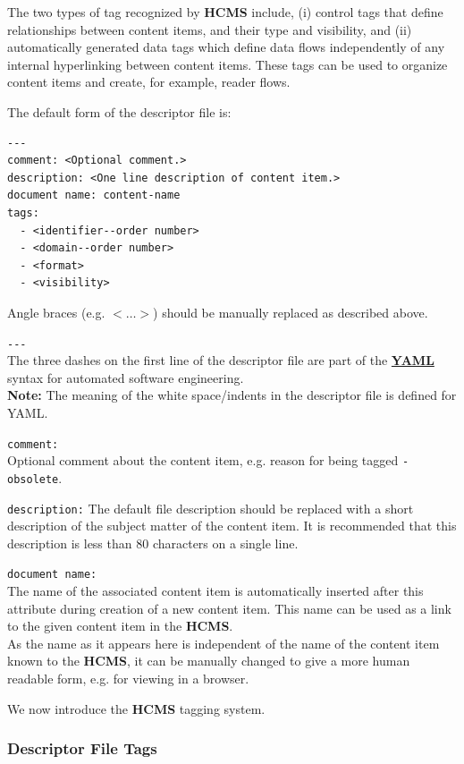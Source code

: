 \documentclass[12pt]{article}
\begin{document}
The two types of tag recognized by {\bf \small HCMS} include, (i) control tags that define relationships between content items, and their type and visibility, and (ii) automatically generated data tags which define data flows independently of any internal hyperlinking between content items. These tags can be used to organize content items and create, for example, reader flows.

The default form of the descriptor file is:
\begin{verbatim}
---
comment: <Optional comment.>
description: <One line description of content item.>
document name: content-name
tags:
  - <identifier--order number>
  - <domain--order number>
  - <format>
  - <visibility>
\end{verbatim}
Angle braces (e.g. {\small{$<\ldots>$}}) should be manually replaced as described above.
\begin{description}
\item{\tt -{}-{}-}\\
The three dashes on the first line of the descriptor file are part of the \href{http://yaml.org}{\bf \small YAML} syntax for automated software engineering. \\
{\bf Note:} The meaning of the white space/indents in the descriptor file is defined for YAML.
\item{\tt comment:}\\
Optional comment about the content item, e.g. reason for being tagged {\tt -\,obsolete}.
\item{\tt description:} The default file description should be replaced with a short description of the subject matter of the content item. It is recommended that this description is less than 80 characters on a single line.
\item[]{\tt document\,name:}\\
The name of the associated content item is automatically inserted after this attribute during creation of a new content item. This name can be used as a link to the given content item in the {\bf \small HCMS}.\\
As the name as it appears here is independent of the name of the content item known to the {\bf \small HCMS}, it can be manually changed to give a more human readable form, e.g. for viewing in a browser.
\end{description}
We now introduce the {\bf \small HCMS} tagging system.

\subsubsection*{Descriptor File Tags}
\end{document}
